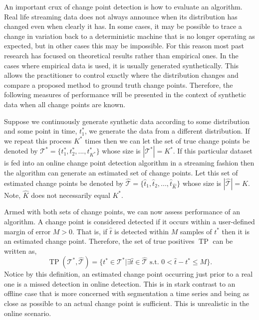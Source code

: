An important crux of change point detection is how to evaluate an algorithm. Real life streaming data does not always announce when its distribution has changed even when clearly it has. In some cases, it may be possible to trace a change in variation back to a deterministic machine that is no longer operating as expected, but in other cases this may be impossible. For this reason most past research has focused on theoretical results rather than empirical ones. In the cases where empirical data is used, it is usually generated synthetically. This allows the practitioner to control exactly where the distribution changes and compare a proposed method to ground truth change points. Therefore, the following measures of performance will be presented in the context of synthetic data when all change points are known.

Suppose we continuously generate synthetic data according to some distribution and some point in time, $t_1^*$, we generate the data from a different distribution. If we repeat this process $K^*$ times then we can let the set of true change points be denoted by $\mathcal{T}^*=\{t_1^*, t_2^*,...,t_{K^*}^*\}$ whose size is $|\mathcal{T}^*| = K^*$. If this particular dataset is fed into an online change point detection algorithm in a streaming fashion then the algorithm can generate an estimated set of change points. Let this set of estimated change points be denoted by $\hat{\mathcal{T}}=\{\hat{t}_1, \hat{t}_2,...,\hat{t}_{\hat{K}}\}$ whose size is $|\hat{\mathcal{T}}| = \hat{K}$. Note, $\hat{K}$ does not necessarily equal $K^*$.

Armed with both sets of change points, we can now assess performance of an algorithm. A change point is considered detected if it occurs within a user-defined margin of error $M>0$. That is, if $\hat{t}$ is detected within $M$ samples of $t^*$ then it is an estimated change point. Therefore, the set of true positives $\operatorname{TP}$ can be written as,
\begin{equation}
\operatorname{TP}(\mathcal{T}^*, \hat{\mathcal{T}}) = \{t^* \in \mathcal{T}^* | \exists \hat{t} \in  \hat{\mathcal{T}} \text{ s.t. } 0 < \hat{t} - t^* \leq M\}.
\end{equation}
Notice by this definition, an estimated change point occurring just prior to a real one is a missed detection in online detection. This is in stark contrast to an offline case that is more concerned with segmentation a time series and being as close as possible to an actual change point is sufficient. This is unrealistic in the online scenario.

